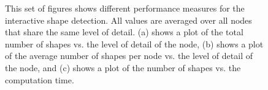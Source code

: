 \begin{figure}[p]
\centering
{}\par\medskip
{}\par\medskip   
{} 
\caption[Performance graphs of the interactive shape detection.]
{This set of figures shows different performance measures for the interactive shape detection. All values are averaged over all nodes that share the same level of detail. (a) shows a plot of the total number of shapes vs. the level of detail of the node, (b) shows a plot of the average number of shapes per node vs. the level of detail of the node, and (c) shows a plot of the number of shapes vs. the computation time.}
\label{fig:shape_detection_graphs}
\end{figure}


